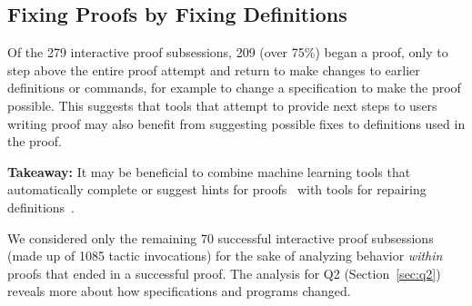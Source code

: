 \subsection{Fixing Proofs by Fixing Definitions}
\label{sec:feedback}

Of the 279 interactive proof subsessions, 209 (over 75\%) began a proof,
only to step above the entire proof attempt and
return to make changes to earlier definitions or commands, for example
to change a specification to make the proof possible.
This suggests that tools that attempt to provide next steps to users writing proof
may also benefit from suggesting possible fixes to definitions used in the proof.
\begin{displayquote}
  \textbf{Takeaway:}
  It may be beneficial to combine machine learning tools
  that automatically complete or suggest hints for
  proofs~\cite{proverbot9001, Komendantskaya2012, Nagashima2018, Gauthier2017b,
    Yang2019}
  with tools for repairing definitions~\cite{Ringer2018, robert2018}.
\end{displayquote}

We considered only the remaining 70 successful interactive proof subsessions
(made up of 1085 tactic invocations)
for the sake of analyzing behavior \textit{within} proofs that
ended in a successful proof.
The analysis for Q2 (Section~\ref{sec:q2}) reveals more about
how specifications and programs changed.

